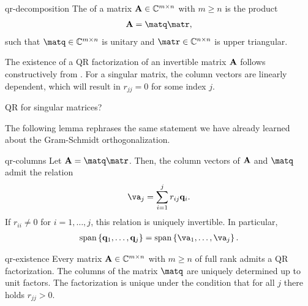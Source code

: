 \begin{Definition}{qr-decomposition}
  The  of a matrix $\mathbf A\in\mathbb C^{m\times n}$
  with $m\ge n$ is the product
  \begin{gather}
    \mata = \matq\matr,
  \end{gather}
  such that $\matq \in\C^{m\times n}$ is unitary and
  $\matr\in \C^{n\times n}$ is upper triangular.
\end{Definition}

\begin{intro}
  The existence of a QR factorization of an invertible matrix $\mathbf A$
  follows constructively from . For a
  singular matrix, the column vectors are linearly dependent, which
  will result in $r_{jj}=0$ for some index $j$.
\begin{todo} %
    QR for singular matrices?
\end{todo}
  The following lemma rephrases the same statement we have already
  learned about the Gram-Schmidt orthogonalization.
\end{intro}

\begin{Lemma}{qr-columns}
  Let $\mata = \matq\matr$. Then, the column vectors of $\mathbf A$ and
  $\matq$ admit the relation
  \begin{gather}
    \va_j = \sum_{i=1}^j r_{ij} \vq_i.
  \end{gather}
  If $r_{ii}\neq 0$ for $i=1,\dots,j$, this relation is uniquely
  invertible. In particular,
  \begin{gather}
    \spann{\vq_1,\dots,\vq_j}
    =
    \spann{\va_1,\dots,\va_j}.
  \end{gather}
\end{Lemma}

\begin{Theorem}{qr-existence}
  Every matrix $\mathbf A\in\mathbb C^{m\times n}$ with $m\ge n$ of full rank
  admits a QR factorization. The columns of the matrix $\matq$ are
  uniquely determined up to unit factors. The factorization is unique
  under the condition that for all $j$ there holds $r_{jj} > 0$.
\end{Theorem}

